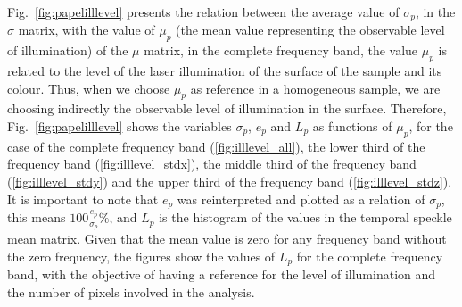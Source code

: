 \documentclass[review]{elsarticle}
\begin{document}
Fig.~\ref{fig:papelilllevel} presents the relation between the average value of $\sigma_p$,
in the $\sigma$ matrix, with the value of $\mu_p$ (the mean value representing the observable level of illumination) of the $\mu$ matrix, 
in the complete frequency band, the value $\mu_p$
is related to the level of the laser illumination of the surface of the sample \cite{Nothdurft:05}
and its colour. Thus, when we choose $\mu_p$  as reference
in a homogeneous sample,
we are choosing indirectly the observable level of illumination in the surface.
Therefore, Fig.~\ref{fig:papelilllevel} shows the variables $\sigma_p$, $e_p$ and $L_p$ as functions
of  $\mu_p$, for the case of the complete frequency band (\ref{fig:illlevel_all}), 
the lower third of the frequency band (\ref{fig:illlevel_stdx}),
the middle third of the frequency band (\ref{fig:illlevel_stdy}) 
and the upper third of the frequency band (\ref{fig:illlevel_stdz}).
It is important to note that $e_p$ was reinterpreted and plotted as a relation of $\sigma_p$, this means  $100 \frac{e_p}{\sigma_p}\%$,
and $L_p$ is the histogram of the values in the temporal speckle mean matrix.
Given that the mean value is zero for any frequency band without the zero frequency,
the figures show the values of $L_p$ for the complete frequency band, 
with the objective of having a reference for the level of illumination and the number of pixels involved in the analysis.
\end{document}
